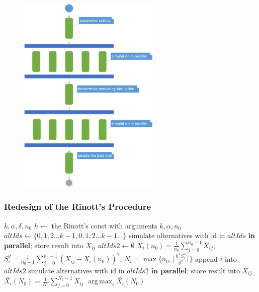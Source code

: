 \documentclass{beamer}
\DeclareMathOperator*{\argmax}{arg\,max}
\begin{document}
\begin{frame}
\begin{figure}[ht]
\centering
\includegraphics[height=96mm]{rinott_activity.png}
\end{figure}
\end{frame}

\begin{frame}
\frametitle{Redesign of the Rinott's Procedure}
\begin{algorithmic}[1]
\Require $k, \alpha, \delta, n_0$
\State $h \gets$ the Rinott's const with arguments $k, \alpha, n_0$
\State $altIds \gets \{0, 1, 2...k - 1, 0, 1, 2...k - 1...\}$ 
\State simulate alternatives with id in $altIds$ \textbf{in parallel}; store result into $X_{ij}$
\State $altIds2 \gets \emptyset$
  \State $\bar{X_i}(n_0) = \frac{1}{n_0} \sum_{j=0}^{n_0 - 1}X_{ij}$;  $S_i^2 = \frac{1}{n_0 - 1} \sum_{j=0}^{n_0 - 1}(X_{ij} - \bar{X_i}(n_0))^2$;
  \State $N_i = \max\{n_0, \lceil \frac{h^2S_i^2}{\delta^2} \rceil\}$
    \State append $i$ into $altIds2$
  \EndFor
\EndFor
\State simulate alternatives with id in $altIds2$ \textbf{in parallel}; store result into $X_{ij}$
  \State $\bar{X_i}(N_0) = \frac{1}{N_0} \sum_{j=0}^{N_0 - 1}X_{ij}$
\EndFor
\State \Return $\argmax_{i}\bar{X_i}(N_0)$
\end{algorithmic}
\end{frame}
\end{document}
